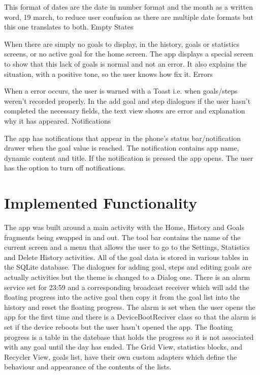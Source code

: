 \documentclass[12pt]{report}
\begin{document}
This format of dates are the date in number format and the month as a written word, 19 march, to reduce user confusion as there are multiple date formats but this one translates to both.
 \newline
 \newline
Empty States

When there are simply no goals to display, in the history, goals or statistics screens, or no active goal for the home screen. The app displays a special screen to show that this lack of goals is normal and not an error. It also explains the situation, with a positive tone, so the user knows how fix it. 
 \newline
 \newline
Errors

When a error occurs, the user is warned with a Toast i.e. when goals/steps weren't recorded properly.
In the add goal and step dialogues if the user hasn't completed the necessary fields, the text view shows are error and explanation why it has appeared.
 \newline
 \newline
Notifications

The app has notifications that appear in the phone's status bar/notification drawer when the goal value is reached. The notification contains app name, dynamic content and title. If the notification is pressed the app opens. The user has the option to turn off notifications.


\section{Implemented Functionality}

The app was built around a main activity with the Home, History and Goals fragments being swapped in and out. The tool bar contains the name of the current screen and a menu that allows the user to go to the Settings, Statistics and Delete History activities. All of the goal data is stored in various tables in the SQLite database. The dialogues for adding goal, steps and editing goals are actually activities but the theme is changed to a Dialog one. There is an alarm service set for 23:59 and a corresponding broadcast receiver which will add the floating progress into the active goal then copy it from the goal list into the history and reset the floating progress. The alarm is set when the user opens the app for the first time and there is a DeviceBootReciver class so that the alarm is set if the device reboots but the user hasn't opened the app. The floating progress is a table in the datebase that holds the progress so it is not associated with any goal until the day has ended. The Grid View, statistics blocks, and Recycler View, goals list, have their own custom adapters which define the behaviour and appearance of the contents of the lists.
\end{document}
